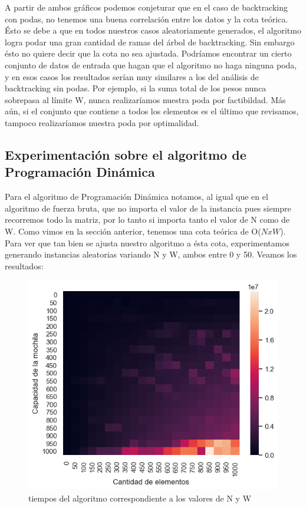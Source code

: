 A partir de ambos gráficos podemos conjeturar que en el caso de backtracking con podas, no tenemos una buena correlación entre los datos y la cota teórica. Ésto se debe a que en todos nuestros casos aleatoriamente generados, el algoritmo logra podar una gran cantidad de ramas del árbol de backtracking. Sin embargo ésto no quiere decir que la cota no sea ajustada. Podríamos encontrar un cierto conjunto de datos de entrada que hagan que el algoritmo no haga ninguna poda, y en esos casos los resultados serían muy similares a los del análisis de backtracking sin podas. Por ejemplo, si la suma total de los pesos nunca sobrepasa al límite W, nunca realizaríamos nuestra poda por factibildad. Más aún, si el conjunto que contiene a todos los elementos es el último que revisamos, tampoco realizaríamos nuestra poda por optimalidad.


\subsection{Experimentación sobre el algoritmo de Programación Dinámica}
Para el algoritmo de Programación Dinámica notamos, al igual que en el algoritmo de fuerza bruta, que no importa el valor de la instancia pues siempre recorremos todo la matriz, por lo tanto si importa tanto el valor de N como de W. Como vimos en la sección anterior, tenemos una cota teórica de O($NxW$). Para ver que tan bien se ajusta nuestro algoritmo a ésta cota, experimentamos generando instancias aleatorias variando N y W, ambos entre 0 y 50. Veamos los resultados:

\begin{figure}[!htb]
   \begin{minipage}{0.6\textwidth}
     \centering
     \includegraphics[width=1\linewidth]{img/heatmap}
     \caption{tiempos del algoritmo correspondiente a los valores de N y W}
   \end{minipage}
\end{figure}

